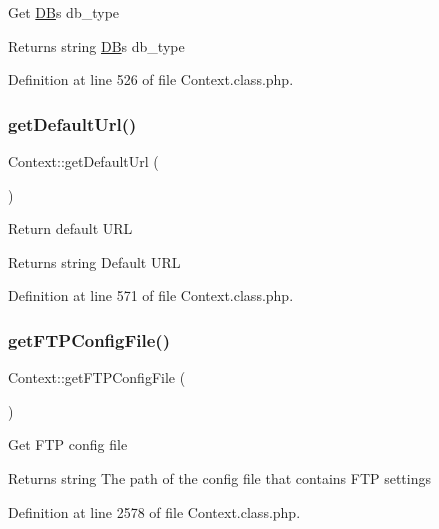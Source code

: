 Get \hyperlink{classDB}{DB}\textquotesingle{}s db\+\_\+type

\begin{DoxyReturn}{Returns}
string \hyperlink{classDB}{DB}\textquotesingle{}s db\+\_\+type 
\end{DoxyReturn}


Definition at line 526 of file Context.\+class.\+php.

\mbox{\label{classContext_abf99203a93b0b0de0da3fbeced6ce333}} 
\subsubsection{\texorpdfstring{get\+Default\+Url()}{getDefaultUrl()}}
{\footnotesize\ttfamily Context\+::get\+Default\+Url (\begin{DoxyParamCaption}{ }\end{DoxyParamCaption})}

Return default U\+RL

\begin{DoxyReturn}{Returns}
string Default U\+RL 
\end{DoxyReturn}


Definition at line 571 of file Context.\+class.\+php.

\mbox{\label{classContext_ab7bb799f55be29174c8a15659dab823a}} 
\subsubsection{\texorpdfstring{get\+F\+T\+P\+Config\+File()}{getFTPConfigFile()}}
{\footnotesize\ttfamily Context\+::get\+F\+T\+P\+Config\+File (\begin{DoxyParamCaption}{ }\end{DoxyParamCaption})}

Get F\+TP config file

\begin{DoxyReturn}{Returns}
string The path of the config file that contains F\+TP settings 
\end{DoxyReturn}


Definition at line 2578 of file Context.\+class.\+php.

